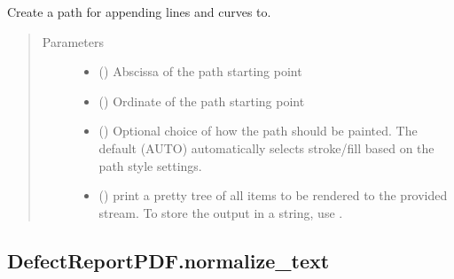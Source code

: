 \documentclass[letterpaper,10pt,english]{sphinxmanual}
\begin{document}
\begin{fulllineitems}
\begin{fulllineitems}
\label{\detokenize{generated/quality_assessment.quality_pdf_report.DefectReportPDF.new_path:quality_assessment.quality_pdf_report.DefectReportPDF.new_path}}
\sphinxAtStartPar
Create a path for appending lines and curves to.
\begin{quote}\begin{description}
\item[{Parameters}] \leavevmode\begin{itemize}
\item {} 
\sphinxAtStartPar
{} () \textendash{} Abscissa of the path starting point

\item {} 
\sphinxAtStartPar
{} () \textendash{} Ordinate of the path starting point

\item {} 
\sphinxAtStartPar
{} () \textendash{} Optional choice of how the path should
be painted. The default (AUTO) automatically selects stroke/fill based
on the path style settings.

\item {} 
\sphinxAtStartPar
{} () \textendash{} print a pretty tree of all items to be rendered
to the provided stream. To store the output in a string, use
.

\end{itemize}

\end{description}\end{quote}

\end{fulllineitems}



\subsection{DefectReportPDF.normalize\_text}
\label{\detokenize{generated/quality_assessment.quality_pdf_report.DefectReportPDF.normalize_text:defectreportpdf-normalize-text}}\label{\detokenize{generated/quality_assessment.quality_pdf_report.DefectReportPDF.normalize_text::doc}}


\end{fulllineitems}
\end{document}
